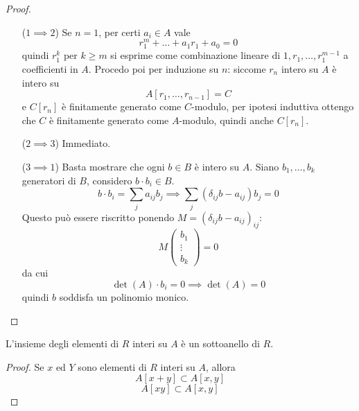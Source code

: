 \begin{proof}\
	\begin{itemize}
		\item[($1\implies 2$)] Se $n=1$, per certi $a_i\in A$ vale 
		\begin{equation*}
		r_1^m+\dots+a_1r_1+a_0=0
		\end{equation*}
		quindi $r_1^k$ per $k\geq m$ si esprime come combinazione lineare di $1,r_1,\dots,r_1^{m-1}$ a coefficienti in $A$. Procedo poi per induzione su $n$: siccome $r_n$ intero su $A$ è intero su 
		\begin{equation*}
			A[r_1,\dots,r_{n-1}]=C
		\end{equation*}
		e $C[r_n]$ è finitamente generato come $C$-modulo, per ipotesi induttiva ottengo che $C$ è finitamente generato come $A$-modulo, quindi anche $C[r_n]$.
		\item[($2\implies 3$)] Immediato.
		\item[($3\implies 1$)] Basta mostrare che ogni $b\in B$ è intero su $A$. Siano $b_1,\dots,b_k$ generatori di $B$, considero $b\cdot b_i \in B$.
		\begin{equation*}
		 b\cdot b_i = \sum_j a_{ij}b_j \implies \sum_j(\delta_{ij}b-a_{ij})b_j=0
		\end{equation*}
		Questo può essere riscritto ponendo $M=(\delta_{ij}b-a_{ij})_{ij}$:
		\begin{equation*}
		M
		\begin{pmatrix}
		b_1\\ \vdots \\ b_k
		\end{pmatrix}
		=0
		\end{equation*}
		da cui
		\begin{equation*}
		\det(A)\cdot b_i=0 \implies \det(A)=0
		\end{equation*}
		quindi $b$ soddisfa un polinomio monico.
	\end{itemize}
\end{proof}
\begin{corollario}
	L'insieme degli elementi di $R$ interi su $A$ è un sottoanello di $R$.
\end{corollario}
\begin{proof}
	Se $x$ ed $Y$ sono elementi di $R$ interi su $A$, allora 
	\begin{equation*}
	A[x+y]\subset A[x,y]
	\end{equation*}
	\begin{equation*}
	A[xy]\subset A[x,y]
	\end{equation*}
\end{proof}




